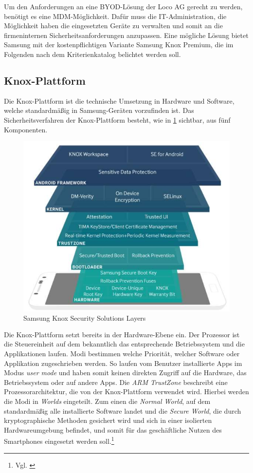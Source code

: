 Um den Anforderungen an eine BYOD-Lösung der Loco AG gerecht zu werden, benötigt es eine MDM-Möglichkeit. Dafür muss die IT-Administration, die Möglichkeit haben die eingesetzten Geräte zu verwalten und somit an die firmeninternen Sicherheitsanforderungen anzupassen. Eine mögliche Lösung bietet Samsung mit der kostenpflichtigen Variante Samsung Knox Premium, die im Folgenden nach dem Kriterienkatalog belichtet werden soll. 

\subsection{Knox-Plattform}
Die Knox-Plattform ist die technische Umsetzung in Hardware und Software, welche standardmäßig in Samsung-Geräten vorzufinden ist. Das Sicherheitsverfahren der Knox-Plattform besteht, wie in \cref{fig:SamKno1} sichtbar, aus fünf Komponenten.
\begin{figure}[hbt]
\centering
\includegraphics[width=1\textwidth]{Bilder/sk_1}
\caption{Samsung Knox Security Solutions Layers}\label{fig:SamKno1}
\end{figure}
Die Knox-Plattform setzt bereits in der Hardware-Ebene ein. Der Prozessor ist die Steuereinheit auf dem bekanntlich das entsprechende Betriebssystem und die Applikationen laufen. Modi bestimmen welche Priorität, welcher Software oder Applikation zugeschrieben werden. So laufen vom Benutzer installierte Apps im Modus \textit{user mode} und haben somit keinen direkten Zugriff auf die Hardware, das Betriebssystem oder auf andere Apps. Die \textit{ARM TrustZone} beschreibt eine Prozessorarchitektur, die von der Knox-Plattform verwendet wird. Hierbei werden die Modi in \textit{Worlds} eingeteilt. Zum einen die \textit{Normal World}, auf dem standardmäßig alle installierte Software landet und die \textit{Secure World}, die durch kryptographische Methoden gesichert wird und sich in einer isolierten Hardwareumgebung befindet, und somit für das geschäftliche Nutzen des Smartphones eingesetzt werden soll.\footnote{Vgl. \cite{sam2017c}}


